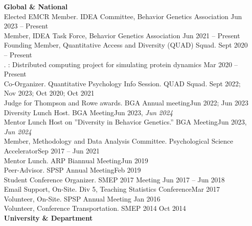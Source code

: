 {\large \textbf{Global \& National}}\\
Elected EMCR Member. IDEA Committee, Behavior Genetics Association \hfill{Jun 2023 – Present}\\ %
Member, IDEA Task Force, Behavior Genetics Association \hfill{Jun 2021 – Present}\\
Founding Member, Quantitative Access and Diversity (QUAD) Squad. \hfill{Sept 2020 – Present}\\%
. : Distributed computing project for simulating protein dynamics \hfill{Mar 2020 – Present}\\
Co-Organizer. Quantitative Psychology Info Session. QUAD Squad. \hfill{Sept 2022; Nov 2023;}\newline
\hspace*{0pt}\hfill{Oct 2020; Oct 2021}\smallskip\\
Judge for Thompson and Rowe awards. BGA Annual meeting\hfill{Jun 2022; Jun 2023}\\
Diversity Lunch Host. BGA Meeting\hfill{Jun 2023, \textit{Jun 2024}}\\%
Mentor Lunch Host on ''Diversity in Behavior Genetics.'' BGA Meeting\hfill{Jun 2023, \textit{Jun 2024}}\\
Member, Methodology and Data Analysis Committee. Psychological Science Accelerator\hfill{Sep 2017 – Jun 2021}\\
Mentor Lunch. ARP Biannual Meeting\hfill{Jun 2019}\\
Peer-Advisor. SPSP Annual Meeting\hfill{Feb 2019}\\
Student Conference Organizer. SMEP 2017 Meeting \hfill{Jun 2017 – Jun 2018}\\
Email Support, On-Site. Div 5, Teaching Statistics Conference\hfill{Mar 2017}\\
Volunteer, On-Site. SPSP Annual Meeting \hfill{Jan 2016}\\
Volunteer, Conference Transportation. SMEP 2014  \hfill{Oct 2014}\medskip\\
{\large \textbf{University \& Department}}\\
